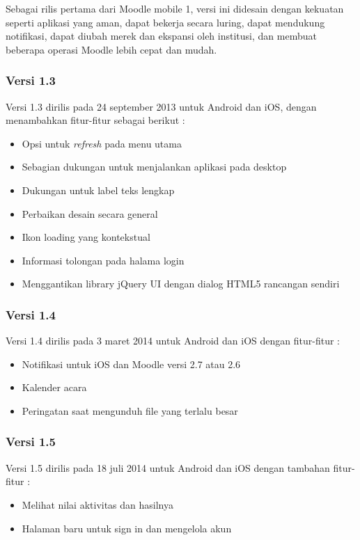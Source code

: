 Sebagai rilis pertama dari Moodle mobile 1, versi ini didesain dengan kekuatan seperti aplikasi yang aman, dapat bekerja secara luring, dapat mendukung notifikasi, dapat diubah merek dan ekspansi oleh institusi, dan membuat beberapa operasi Moodle lebih cepat dan mudah. \cite{moodle:dev}

\subsubsection{Versi 1.3}
Versi 1.3 dirilis pada 24 september 2013 untuk Android dan iOS, dengan menambahkan fitur-fitur sebagai berikut : \cite{moodle:dev}
	\begin{itemize}
		\item Opsi untuk \textit{refresh} pada menu utama
		\item Sebagian dukungan untuk menjalankan aplikasi pada desktop
		\item Dukungan untuk label teks lengkap
		\item Perbaikan desain secara general
		\item Ikon loading yang kontekstual
		\item Informasi tolongan pada halama login
		\item Menggantikan library jQuery UI dengan dialog HTML5 rancangan sendiri 
	\end{itemize}

\subsubsection{Versi 1.4}
Versi 1.4 dirilis pada 3 maret 2014 untuk Android dan iOS dengan fitur-fitur : \cite{moodle:dev}
	\begin{itemize}
		\item Notifikasi untuk iOS dan Moodle versi 2.7 atau 2.6
		\item Kalender acara
		\item Peringatan saat mengunduh file yang terlalu besar
	\end{itemize}

\subsubsection{Versi 1.5}
Versi 1.5 dirilis pada 18 juli 2014 untuk Android dan iOS dengan tambahan fitur-fitur : \cite{moodle:dev}

	\begin{itemize}
		\item Melihat nilai aktivitas dan hasilnya
		\item Halaman baru untuk sign in dan mengelola akun
	\end{itemize}

